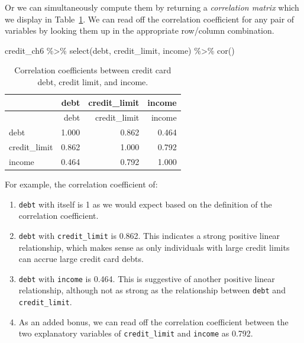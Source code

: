 \documentclass[
  letterpaper,
  DIV=11,
  numbers=noendperiod]{scrreprt}
\newenvironment{Shaded}{\begin{snugshade}}{\end{snugshade}}
\newcommand{\FunctionTok}[1]{\textcolor[rgb]{0.28,0.35,0.67}{#1}}
\newcommand{\NormalTok}[1]{\textcolor[rgb]{0.00,0.23,0.31}{#1}}
\newcommand{\SpecialCharTok}[1]{\textcolor[rgb]{0.37,0.37,0.37}{#1}}
\providecommand{\tightlist}{%
  \setlength{\itemsep}{0pt}\setlength{\parskip}{0pt}}\usepackage{longtable,booktabs,array}
\theoremstyle{definition}
\theoremstyle{remark}
\begin{document}
Or we can simultaneously compute them by returning a \emph{correlation
matrix} which we display in Table~\ref{tbl-model3-correlation}.
 We can read off the correlation
coefficient for any pair of variables by looking them up in the
appropriate row/column combination.

\begin{Shaded}
\begin{Highlighting}[]
\NormalTok{credit\_ch6 }\SpecialCharTok{\%\textgreater{}\%}
  \FunctionTok{select}\NormalTok{(debt, credit\_limit, income) }\SpecialCharTok{\%\textgreater{}\%} 
  \FunctionTok{cor}\NormalTok{()}
\end{Highlighting}
\end{Shaded}

\hypertarget{tbl-model3-correlation}{}
\begin{longtable}[]{@{}lrrr@{}}
\caption{\label{tbl-model3-correlation}Correlation coefficients between
credit card debt, credit limit, and income.}\tabularnewline
\toprule\noalign{}
& debt & credit\_limit & income \\
\midrule\noalign{}
\endfirsthead
\toprule\noalign{}
& debt & credit\_limit & income \\
\midrule\noalign{}
\endhead
\bottomrule\noalign{}
\endlastfoot
debt & 1.000 & 0.862 & 0.464 \\
credit\_limit & 0.862 & 1.000 & 0.792 \\
income & 0.464 & 0.792 & 1.000 \\
\end{longtable}

For example, the correlation coefficient of:

\begin{enumerate}
\def\labelenumi{\arabic{enumi}.}
\tightlist
\item
  \texttt{debt} with itself is 1 as we would expect based on the
  definition of the correlation coefficient.
\item
  \texttt{debt} with \texttt{credit\_limit} is 0.862. This indicates a
  strong positive linear relationship, which makes sense as only
  individuals with large credit limits can accrue large credit card
  debts.
\item
  \texttt{debt} with \texttt{income} is 0.464. This is suggestive of
  another positive linear relationship, although not as strong as the
  relationship between \texttt{debt} and \texttt{credit\_limit}.
\item
  As an added bonus, we can read off the correlation coefficient between
  the two explanatory variables of \texttt{credit\_limit} and
  \texttt{income} as 0.792.
\end{enumerate}
\end{document}
